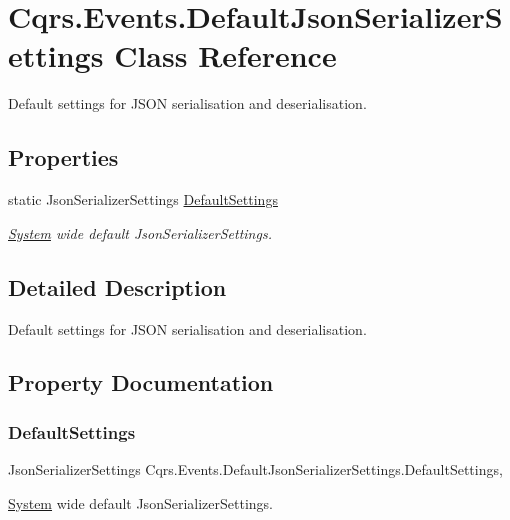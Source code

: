 \hypertarget{classCqrs_1_1Events_1_1DefaultJsonSerializerSettings}{}\section{Cqrs.\+Events.\+Default\+Json\+Serializer\+Settings Class Reference}
\label{classCqrs_1_1Events_1_1DefaultJsonSerializerSettings}


Default settings for J\+S\+ON serialisation and deserialisation.  


\subsection*{Properties}
\begin{DoxyCompactItemize}
\item 
static Json\+Serializer\+Settings \hyperlink{classCqrs_1_1Events_1_1DefaultJsonSerializerSettings_af3524ebd3c1576ca4e33bcfbaad56740_af3524ebd3c1576ca4e33bcfbaad56740}{Default\+Settings}
\begin{DoxyCompactList}\small\item\em \hyperlink{namespaceSystem}{System} wide default Json\+Serializer\+Settings. \end{DoxyCompactList}\end{DoxyCompactItemize}


\subsection{Detailed Description}
Default settings for J\+S\+ON serialisation and deserialisation. 



\subsection{Property Documentation}
\mbox{\label{classCqrs_1_1Events_1_1DefaultJsonSerializerSettings_af3524ebd3c1576ca4e33bcfbaad56740_af3524ebd3c1576ca4e33bcfbaad56740}} 
\subsubsection{\texorpdfstring{Default\+Settings}{DefaultSettings}}
{\footnotesize\ttfamily Json\+Serializer\+Settings Cqrs.\+Events.\+Default\+Json\+Serializer\+Settings.\+Default\+Settings\hspace{0.3cm}{\ttfamily [static]}, {\ttfamily [get]}}



\hyperlink{namespaceSystem}{System} wide default Json\+Serializer\+Settings. 

